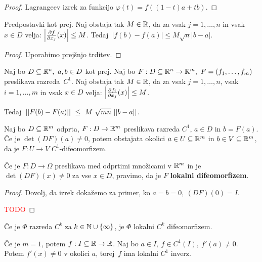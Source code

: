 \begin{proof}
    Lagrangeev izrek za funkcijo $\varphi(t) = f((1-t)a + tb)$.
\end{proof}

\begin{lema}
    Predpostavki kot prej. Naj obstaja tak $M \in \mathbb{R}$, da za vsak $j = 1, \ldots, n$ in vsak $x \in D$ velja: $\left|\frac{\partial f}{\partial x_j}(x)\right| \leq M$. Tedaj~$|f(b)-f(a)| \leq M \sqrt{n}|b-a|$.
\end{lema}

\begin{proof}
    Uporabimo prejšnjo trditev.
\end{proof}

\begin{lema}
    Naj bo $D \subseteq \mathbb{R}^n, \ a,b \in D$ kot prej. Naj bo $F: D \subseteq \mathbb{R}^n \to \mathbb{R}^m, \ F = (f_1, \ldots, f_m)$ preslikava razreda~$C^1$. Naj obstaja tak $M \in \mathbb{R}$, da za vsak $j = 1, \ldots, n$, vsak $i = 1, \ldots, m$ in vsak $x \in D$ velja: $\left|\frac{\partial f_i}{\partial x_j}(x)\right| \leq M$. 
    
    Tedaj~$||F(b) - F(a)||~\leq~M~\sqrt{mn}~||b - a||$.
\end{lema}

\begin{izrek}
    Naj bo $D \subseteq \mathbb{R}^m$ odprta, $F: D \to \mathbb{R}^m$ preslikava razreda $C^1$,  $a \in D$ in $b = F(a)$.
    Če je $\det(DF)(a) \neq 0$, potem obstajata okolici $a \in U \subseteq \mathbb{R}^m$ in $b \in V \subseteq \mathbb{R}^m$, da je $F: U \to V$ $C^1$-difeomorfizem.    
\end{izrek}

\begin{definicija}
    Če je $F: D \to \Omega$ preslikava med odprtimi množicami v $\mathbb{R}^m$ in je $\det(DF)(x) \neq 0$ za vse $x \in D$, pravimo, da je $F$ \textbf{lokalni difeomorfizem}.
\end{definicija}

\begin{proof}
    Dovolj, da izrek dokažemo za primer, ko $a=b=0, \ (DF)(0) = I$.

    \textcolor{red}{TODO}
\end{proof}

\begin{posledica}
    Če je $\Phi$ razreda $C^k$ za $k \in \mathbb{N} \cup \left\{\infty\right\}$, je $\Phi$ lokalni $C^k$ difeomorfizem.
\end{posledica}

\begin{opomba}
    Če je $m=1$, potem $f: I \subseteq \mathbb{R} \to \mathbb{R}$. Naj bo $a \in I, \ f \in C^1(I), \ f'(a) \neq 0$. Potem $f'(x) \neq 0$ v okolici $a$, torej~$f$ ima lokalni $C^1$ inverz.
\end{opomba}

